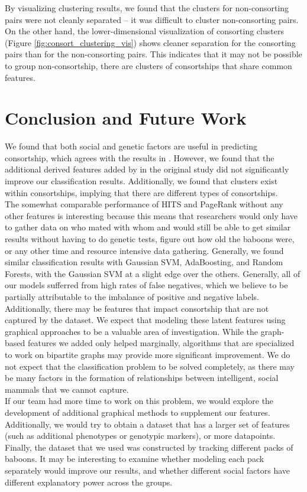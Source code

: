 \documentclass[twoside,twocolumn,paper=letter,fontsize=11pt]{article}
\begin{document}
By visualizing clustering results, we found that the clusters for non-consorting
pairs were not cleanly separated -- it was difficult to cluster non-consorting
pairs. On the other hand, the lower-dimensional visualization of consorting
clusters  (Figure \ref{fig:consort_clustering_vis}) shows cleaner separation for
the consorting pairs than for the non-consorting pairs. This indicates that it
may not be possible to group non-consortship, there are clusters of consortships
that share common features.


\section{Conclusion and Future Work}

We found that both social and genetic factors are useful in predicting
consortship, which agrees with the results in \cite{Tung:2012}. However, we
found that the additional derived features added by in the original study did
not significantly improve our classification results. Additionally, we found
that clusters exist within consortships, implying that there are different types
of consortships.\\
The somewhat comparable performance of HITS and PageRank without any other features is interesting because this means that researchers would only have to gather data on who mated with whom and would still be able to get similar results without having to do genetic tests, figure out how old the baboons were, or any other time and resource intensive data gathering. 
Generally, we found similar classification results with Gaussian SVM,
AdaBoosting, and Random Forests, with the Gaussian SVM at a slight edge over the
others. Generally, all of our models sufferred from high rates of false
negatives, which we believe to be partially attributable to the imbalance of
positive and negative labels. Additionally, there may be features that impact
consortship that are not captured by the dataset. We expect that modeling these
latent features using graphical approaches to be a valuable area of
investigation. While the graph-based features we added only helped marginally,
algorithms that are specialized to work on bipartite graphs may provide more
significant improvement. We do not expect that the classification problem to be
solved completely, as there may be many factors in the formation of
relationships between intelligent, social mammals that we cannot capture.
\\

If our team had more time to work on this problem, we would explore the
development of additional graphical methods to supplement our features.
Additionally, we would try to obtain a dataset that has a larger set of features
(such as additional phenotypes or genotypic markers), or more datapoints.
Finally, the dataset that we used was constructed by tracking different packs of
baboons. It may be interesting to examine whether modeling each pack separately
would improve our results, and whether different social factors have different
explanatory power across the groups.
\\
\end{document}
